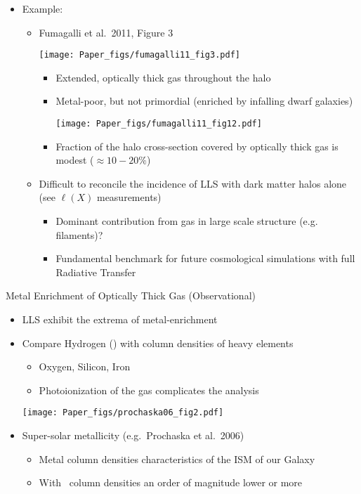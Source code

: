\documentclass[12pt,letterpaper]{article}
\begin{document}
\begin{Aenumerate}
\begin{itemize}
  \item Example: 
  	\begin{itemize}
  	\item Fumagalli et al.\ 2011, Figure 3

\texttt{[image: Paper\_figs/fumagalli11\_fig3.pdf]}

		\begin{itemize}
		\item Extended, optically thick gas throughout the halo
		\item Metal-poor, but not primordial (enriched by infalling
		dwarf galaxies)

\texttt{[image: Paper\_figs/fumagalli11\_fig12.pdf]}

		\item Fraction of the halo cross-section covered by 
		optically thick gas is modest ($\approx 10-20\%$)
		\end{itemize}

    \item Difficult to reconcile the incidence of LLS with dark matter halos
  	alone (see $\ell(X)$ measurements)
		\begin{itemize}
		\item Dominant contribution from gas in large scale structure (e.g.
		filaments)?
		\item Fundamental benchmark for future cosmological simulations with
		full Radiative Transfer
		\end{itemize}

  	\end{itemize}

  \end{itemize}

{\bf \item Metal Enrichment of Optically Thick Gas (Observational)}
	\begin{itemize}
	\item LLS exhibit the extrema of metal-enrichment
	\item Compare Hydrogen (\nhi) with column densities of heavy elements
		\begin{itemize}
		\item Oxygen, Silicon, Iron
		\item Photoionization of the gas complicates the analysis
		\end{itemize}

\texttt{[image: Paper\_figs/prochaska06\_fig2.pdf]}

	\item Super-solar metallicity (e.g.\ Prochaska et al.\ 2006)
		\begin{itemize}
		\item Metal column densities characteristics of the ISM of 
		our Galaxy
		\item With \nhi\ column densities an order of magnitude lower or more
		\end{itemize}


\end{itemize}
\end{Aenumerate}
\end{document}
